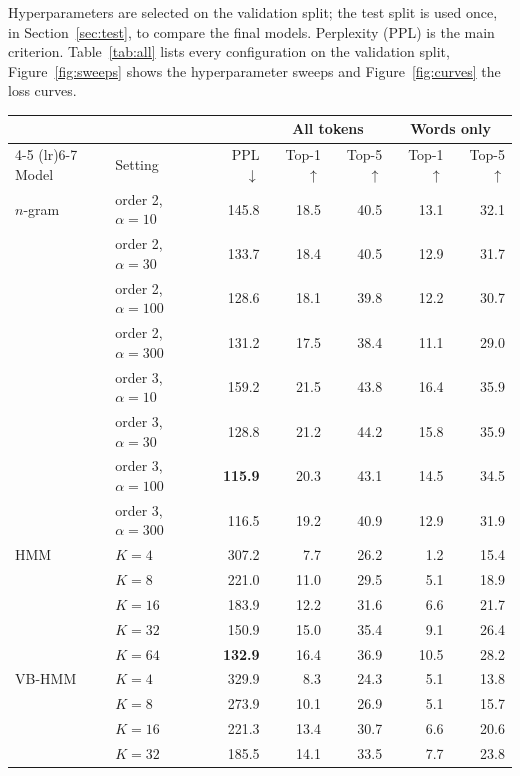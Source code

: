 \documentclass[11pt]{article}
\begin{document}
Hyperparameters are selected on the validation split; the test split is
used once, in Section~\ref{sec:test}, to compare the final models. Perplexity (PPL) is the main criterion. Table~\ref{tab:all} lists every configuration on the
validation split, Figure~\ref{fig:sweeps} shows the hyperparameter sweeps
and Figure~\ref{fig:curves} the loss curves.
\begin{table}[t]
\centering
\small
\begin{tabular}{ll r rr rr}
\toprule
 & & & \multicolumn{2}{c}{All tokens} & \multicolumn{2}{c}{Words only} \\
\cmidrule(lr){4-5} \cmidrule(lr){6-7}
Model & Setting & PPL $\downarrow$ & Top-1 $\uparrow$ & Top-5 $\uparrow$& Top-1 $\uparrow$& Top-5 $\uparrow$\\
\midrule
$n$-gram & order 2, $\alpha = 10$  & 145.8 & 18.5 & 40.5 & 13.1 & 32.1 \\
         & order 2, $\alpha = 30$  & 133.7 & 18.4 & 40.5 & 12.9 & 31.7 \\
         & order 2, $\alpha = 100$ & 128.6 & 18.1 & 39.8 & 12.2 & 30.7 \\
         & order 2, $\alpha = 300$ & 131.2 & 17.5 & 38.4 & 11.1 & 29.0 \\
         & order 3, $\alpha = 10$  & 159.2 & 21.5 & 43.8 & 16.4 & 35.9 \\
         & order 3, $\alpha = 30$  & 128.8 & 21.2 & 44.2 & 15.8 & 35.9 \\
         & order 3, $\alpha = 100$ & \textbf{115.9} & 20.3 & 43.1 & 14.5 & 34.5 \\
         & order 3, $\alpha = 300$ & 116.5 & 19.2 & 40.9 & 12.9 & 31.9 \\
\midrule
HMM & $K = 4$  & 307.2 & 7.7  & 26.2 & 1.2  & 15.4 \\
    & $K = 8$  & 221.0 & 11.0 & 29.5 & 5.1  & 18.9 \\
    & $K = 16$ & 183.9 & 12.2 & 31.6 & 6.6  & 21.7 \\
    & $K = 32$ & 150.9 & 15.0 & 35.4 & 9.1  & 26.4 \\
    & $K = 64$ & \textbf{132.9} & 16.4 & 36.9 & 10.5 & 28.2 \\
\midrule
VB-HMM & $K = 4$  & 329.9 & 8.3  & 24.3 & 5.1 & 13.8 \\
       & $K = 8$  & 273.9 & 10.1 & 26.9 & 5.1 & 15.7 \\
       & $K = 16$ & 221.3 & 13.4 & 30.7 & 6.6 & 20.6 \\
       & $K = 32$ & 185.5 & 14.1 & 33.5 & 7.7 & 23.8 \\

\end{tabular}
\end{table}
\end{document}
